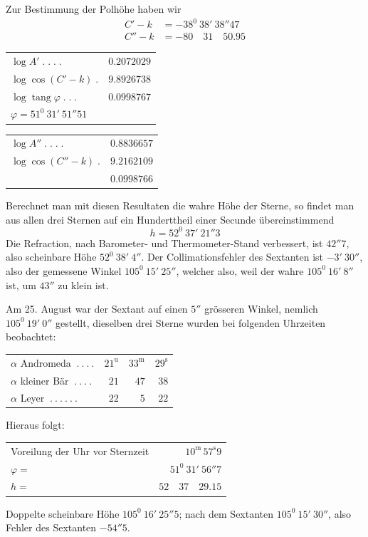 Zur Bestimmung der Polhöhe haben wir
\[
\begin{aligned}
C'-k&=-38^0\ 38'\ 38''47\\
C''-k&=-80\quad31\quad50.95
\end{aligned}
\]
\begin{center}\small
\begin{minipage}[t]{.49\textwidth}\centering
\begin{tabular}[t]{@{}lr@{}}
$\log A'\;.\;.\;.\;.$&$0.2072029$\\
$\log\cos(C'-k)\;.$&$9.8926738$\\\hline
$\log\operatorname{tang}\varphi\;.\;.\;.$&$0.0998767$\\
\multicolumn{2}{l}{$\varphi=51^0\ 31'\ 51''51$}
\end{tabular}
\end{minipage}\hfill
\begin{minipage}[t]{.49\textwidth}\centering
\begin{tabular}[t]{@{}lr@{}}
$\log A''\;.\;.\;.\;.$&$0.8836657$\\
$\log\cos(C''-k)\;.$&$9.2162109$\\\hline
&$0.0998766$
\end{tabular}
\end{minipage}
\end{center}

Berechnet man mit diesen Resultaten die wahre Höhe der Sterne, so findet
man aus allen drei Sternen auf ein Hunderttheil einer Secunde übereinstimmend
\[
h=52^0\ 37'\ 21''3
\]
Die Refraction, nach Barometer- und Thermometer-Stand verbessert, ist
$42''7$, also scheinbare Höhe $52^0\ 38'\ 4''$. Der Collimationsfehler des Sextanten
ist $-3'\ 30''$, also der gemessene Winkel $105^0\ 15'\ 25''$, welcher also, weil der
wahre $105^0\ 16'\ 8''$ ist, um $43''$ zu klein ist.

Am 25. August war der Sextant auf einen $5''$ grösseren Winkel, nemlich
$105^0\ 19'\ 0''$ gestellt, dieselben drei Sterne wurden bei folgenden Uhrzeiten beobachtet:
\begin{center}
\begin{tabular}{lrrr}
$\alpha$ Andromeda $\ .\ .\ .\ .$&$21^{\mathrm u}$&$33^{\mathrm m}$&$29^{\mathrm s}$\\
$\alpha$ kleiner Bär $\ .\ .\ .\ .$&$21$&$47$&$38$\\
$\alpha$ Leyer $\ .\ .\ .\ .\ .\ .$&$22$&$5$&$22$
\end{tabular}
\end{center}
Hieraus folgt:
\begin{center}
\begin{tabular}{lr}
Voreilung der Uhr vor Sternzeit&$10^{\mathrm m}\,57^{\mathrm s}9$\\
$\varphi=$&$51^0\ 31'\ 56''7$\\
$h=$&$52\quad37\quad29.15$
\end{tabular}
\end{center}
Doppelte scheinbare Höhe $105^0\ 16'\ 25''5$; nach dem Sextanten $105^0\ 15'\ 30''$,
also Fehler des Sextanten $-54''5$.

